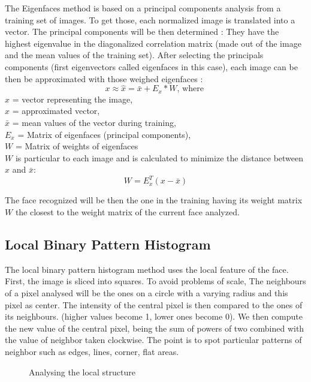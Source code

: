 The Eigenfaces method is based on a principal components analysis from a training set of images. To get those, each normalized image is translated into a vector. The principal components will be then determined : They have the highest eigenvalue in the diagonalized correlation matrix (made out of the image and the mean values of the training set). After selecting the principals components (first eigenvectors called eigenfaces in this case), each image can be then be approximated with those weighed eigenfaces :
\begin{equation}
x \approx  \hat{x} = \bar{x} + E_{x} * W \textrm{, where } 
\end{equation}
$x$ = vector representing the image,\\
$\hat{x}$ = approximated vector,\\
$\bar{x}$ = mean values of the vector during training,\\
$E_{x}$ = Matrix of eigenfaces (principal components),\\
$W$ = Matrix of weights of eigenfaces\\

$W$ is particular to each image and is calculated to minimize the distance between $x$ and $\bar{x}$:
\begin{equation}
W = E_{x}^T (x-\bar{x}) 
\end{equation}

The face recognized will be then the one in the training having its weight matrix $W$ the closest to the weight matrix of the current face analyzed. 

\subsection{Local Binary Pattern Histogram}

The local binary pattern histogram method uses the local feature of the face. First, the image is sliced into squares.
To avoid problems of scale, The neighbours of a pixel analysed will be the ones on a circle with a varying radius and this pixel as center.
The intensity of the central pixel is then compared to the ones of its neighbours. (higher values become 1, lower ones become 0).
We then compute the new value of the central pixel, being the sum of powers of two combined with the value of neighbor taken clockwise. The point is to spot particular patterns of neighbor such as edges, lines, corner, flat areas.

\begin{figure}[ht]
\centering
\caption{Analysing the local structure}
\label{Local Structure}
\end{figure}

